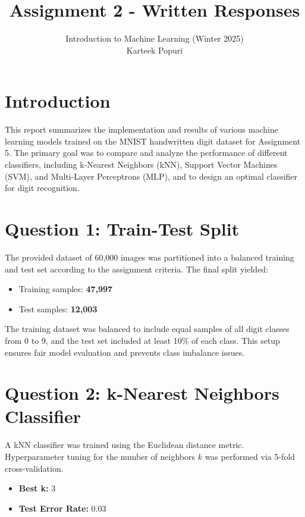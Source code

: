 \documentclass[a4paper,12pt]{article}
\title{Assignment 2 - Written Responses}
\author{Introduction to Machine Learning (Winter 2025)\\ Karteek Popuri}
\date{}
\begin{document}
\maketitle

\section*{Introduction}
This report summarizes the implementation and results of various machine learning models trained on the MNIST handwritten digit dataset for Assignment 5. The primary goal was to compare and analyze the performance of different classifiers, including k-Nearest Neighbors (kNN), Support Vector Machines (SVM), and Multi-Layer Perceptrons (MLP), and to design an optimal classifier for digit recognition.

\section*{Question 1: Train-Test Split}
The provided dataset of 60,000 images was partitioned into a balanced training and test set according to the assignment criteria. The final split yielded:

\begin{itemize}
  \item Training samples: \textbf{47,997}
  \item Test samples: \textbf{12,003}
\end{itemize}

The training dataset was balanced to include equal samples of all digit classes from 0 to 9, and the test set included at least 10\% of each class. This setup ensures fair model evaluation and prevents class imbalance issues.

\section*{Question 2: k-Nearest Neighbors Classifier}
A kNN classifier was trained using the Euclidean distance metric. Hyperparameter tuning for the number of neighbors \(k\) was performed via 5-fold cross-validation.

\begin{itemize}
  \item \textbf{Best k:} 3
  \item \textbf{Test Error Rate:} 0.03
\end{itemize}
\end{document}
